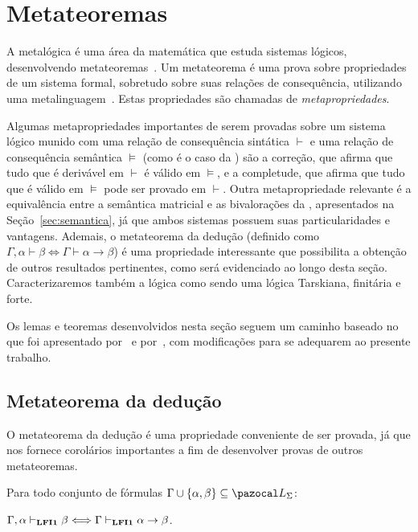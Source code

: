 \section{Metateoremas}\label{sec:metateoremas}
    A metalógica é uma área da matemática que estuda sistemas lógicos, desenvolvendo metateoremas~\cite{Jacquette2002-JACACT-7}. Um metateorema é uma prova sobre propriedades de um sistema formal, sobretudo sobre suas relações de consequência, utilizando uma metalinguagem~\cite{Tarski1956-TARLSM, Rasiowa1963-RASTMO, Barile_2024}. Estas propriedades são chamadas de \textit{metapropriedades}. 
    
    Algumas metapropriedades importantes de serem provadas sobre um sistema lógico munido com uma relação de consequência sintática $\vdash$ e uma relação de consequência semântica $\vDash$ (como é o caso da \lfium{}) são a correção, que afirma que tudo que é derivável em $\vdash$ é válido em $\vDash$, e a completude, que afirma que tudo que é válido em $\vDash$ pode ser provado em $\vdash$. Outra metapropriedade relevante é a equivalência entre a semântica matricial e as bivalorações da \lfium{}, apresentados na Seção~\ref{sec:semantica}, já que ambos sistemas possuem suas particularidades e vantagens. Ademais, o metateorema da dedução (definido como $\Gamma, \alpha \vdash \beta \Longleftrightarrow \Gamma \vdash \alpha \to \beta$) é uma propriedade interessante que possibilita a obtenção de outros resultados pertinentes, como será evidenciado ao longo desta seção. Caracterizaremos também a lógica \lfium{} como sendo uma lógica Tarskiana, finitária e \lfi{} forte.
    
    Os lemas e teoremas desenvolvidos nesta seção seguem um caminho baseado no que foi apresentado por~ e por~, com modificações para se adequarem ao presente trabalho.

    \subsection{Metateorema da dedução}\label{sec:mtd}
        O metateorema da dedução é uma propriedade conveniente de ser provada, já que nos fornece corolários importantes a fim de desenvolver provas de outros metateoremas.
        
        \begin{teorema}\label{teo:deducao}
            Para todo conjunto de fórmulas $\Gamma \cup \{\alpha, \beta \} \subseteq \ling{}$:

            \centering
            {\normalfont{} $\Gamma, \alpha \vdash_{{\normalfont\textbf{LFI1}}{}} \beta \Longleftrightarrow \Gamma \vdash_{{\normalfont\textbf{LFI1}}{}} \alpha \to \beta$.}
        \end{teorema}

